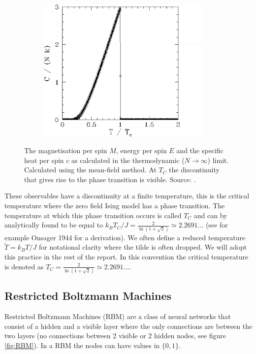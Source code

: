 \documentclass[10 pt, a4paper]{article}
\begin{document}
\begin{figure}[H]
\begin{subfigure}[b]{0.33\textwidth}
    \includegraphics[width=0.93\textwidth]{cTherm}
\end{subfigure}
\caption{The magnetisation per spin $M$, energy per spin $E$ and the specific heat per spin $c$ as calculated in the thermodynamic ($N \to \infty$) limit. Calculated using the mean-field method. At $T_C$ the discontinuity that gives rise to the phase transition is visible. Source: \cite{therm}. }
  \label{fig:obstherm}
\end{figure}

These observables have a discontinuity at a finite temperature, this is the critical temperature where the zero field Ising model has a phase transition. The temperature at which this phase transition occurs is called $T_C$ and can by analytically found to be equal to $k_B T_C / J = \frac{2}{\ln(1 + \sqrt{2})} \simeq 2.2691 \dots $ (see for example Onsager 1944 \cite{onsager} for a derivation). We often define a reduced temperature $\tilde{T} = k_B T / J$ for notational clarity where the tilde is often dropped. We will adopt this practice in the rest of the report. In this convention the critical temperature is denoted as $T_C = \frac{2}{\ln(1 + \sqrt{2})} \simeq 2.2691 \dots$.

\subsection{Restricted Boltzmann Machines}

Restricted Boltzmann Machines (RBM) are a class of neural networks that consist of a hidden and a visible layer where the only connections are between the two layers (no connections between 2 visible or 2 hidden nodes, see figure \ref{fig:RBM}). In a RBM the nodes can have values in $\{0,1\}$.
\end{document}
